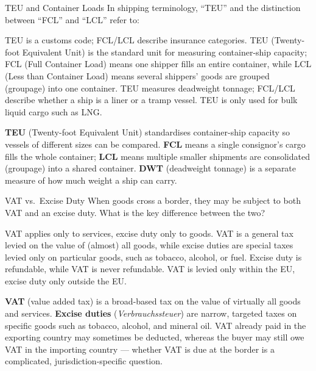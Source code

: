 \begin{question}[type=mc]{TEU and Container Loads}
In shipping terminology, ``TEU'' and the distinction between ``FCL'' and
``LCL'' refer to:
\begin{choices}
  \choice        TEU is a customs code; FCL/LCL describe insurance categories.
  \correctchoice TEU (Twenty-foot Equivalent Unit) is the standard unit for
                 measuring container-ship capacity; FCL (Full Container Load)
                 means one shipper fills an entire container, while LCL (Less
                 than Container Load) means several shippers' goods are
                 grouped (groupage) into one container.
  \choice        TEU measures deadweight tonnage; FCL/LCL describe whether a
                 ship is a liner or a tramp vessel.
  \choice        TEU is only used for bulk liquid cargo such as LNG.
\end{choices}
\begin{solution}
  \textbf{TEU} (Twenty-foot Equivalent Unit) standardises container-ship
  capacity so vessels of different sizes can be compared. \textbf{FCL} means
  a single consignor's cargo fills the whole container; \textbf{LCL} means
  multiple smaller shipments are consolidated (groupage) into a shared
  container. \textbf{DWT} (deadweight tonnage) is a separate measure of how
  much weight a ship can carry.
\end{solution}
\end{question}

\begin{question}[type=mc]{VAT vs.\ Excise Duty}
When goods cross a border, they may be subject to both VAT and an excise
duty. What is the key difference between the two?
\begin{choices}
  \choice        VAT applies only to services, excise duty only to goods.
  \correctchoice VAT is a general tax levied on the value of (almost) all
                 goods, while excise duties are special taxes levied only on
                 particular goods, such as tobacco, alcohol, or fuel.
  \choice        Excise duty is refundable, while VAT is never refundable.
  \choice        VAT is levied only within the EU, excise duty only outside
                 the EU.
\end{choices}
\begin{solution}
  \textbf{VAT} (value added tax) is a broad-based tax on the value of
  virtually all goods and services. \textbf{Excise duties}
  (\emph{Verbrauchssteuer}) are narrow, targeted taxes on specific goods such
  as tobacco, alcohol, and mineral oil. VAT already paid in the exporting
  country may sometimes be deducted, whereas the buyer may still owe VAT in
  the importing country --- whether VAT is due at the border is a
  complicated, jurisdiction-specific question.
\end{solution}
\end{question}


